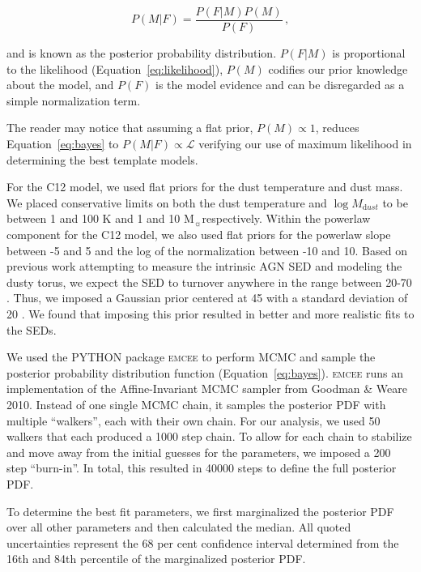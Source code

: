 \documentclass[fleqn, usenatbib]{mnras}
\newcommand{\msun}{M$_{\sun}$}
\begin{document}
\begin{equation}\label{eq:bayes}
P(M|F) = \frac{P(F|M)P(M)}{P(F)}\,,
\end{equation}

\noindent and is known as the posterior probability distribution. $P(F|M)$ is proportional to the likelihood (Equation~\ref{eq:likelihood}), $P(M)$ codifies our prior knowledge about the model, and $P(F)$ is the model evidence and can be disregarded as a simple normalization term. 

The reader may notice that assuming a flat prior, $P(M) \propto 1$, reduces Equation~\ref{eq:bayes} to $P(M|F) \propto \mathcal{L}$ verifying our use of maximum likelihood in determining the best template models.

For the C12 model, we used flat priors for the dust temperature and dust mass. We placed conservative limits on both the dust temperature and $\log M_{\mathrm dust}$ to be between 1 and 100 K and 1 and 10 \msun respectively. Within the powerlaw component for the C12 model, we also used flat priors for the powerlaw slope between -5 and 5 and the log of the normalization between -10 and 10. Based on previous work attempting to measure the intrinsic AGN SED and modeling the dusty torus, we expect the SED to turnover anywhere in the range between 20-70 \micron. Thus, we imposed a Gaussian prior centered at 45 \micron{} with a standard deviation of 20 \micron. We found that imposing this prior resulted in better and more realistic fits to the SEDs.

We used the \textsc{PYTHON} package \textsc{emcee} \citep{Foreman-Mackey:2013lr} to perform MCMC and sample the posterior probability distribution function (Equation~\ref{eq:bayes}). \textsc{emcee} runs an implementation of the Affine-Invariant MCMC sampler from Goodman \& Weare 2010. Instead of one single MCMC chain, it samples the posterior PDF with multiple ``walkers'', each with their own chain. For our analysis, we used 50 walkers that each produced a 1000 step chain. To allow for each chain to stabilize and move away from the initial guesses for the parameters, we imposed a 200 step ``burn-in''. In total, this resulted in 40000 steps to define the full posterior PDF. 

To determine the best fit parameters, we first marginalized the posterior PDF over all other parameters and then calculated the median. All quoted uncertainties represent the 68 per cent confidence interval determined from the 16th and 84th percentile of the marginalized posterior PDF.
\end{document}
